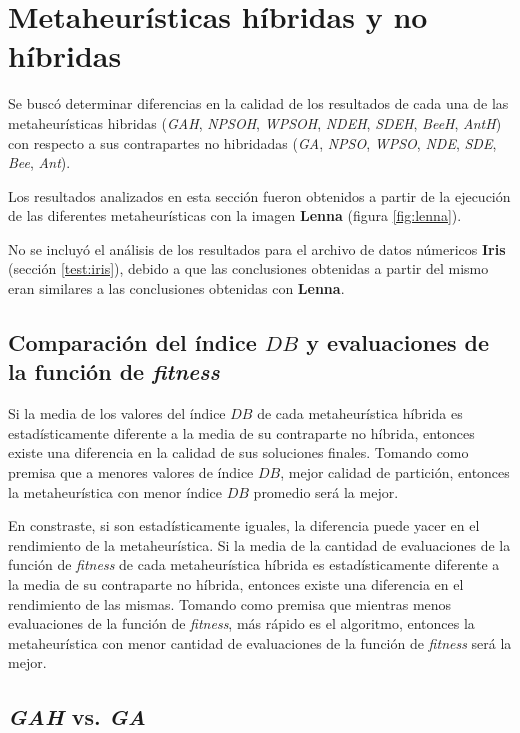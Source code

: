 \chapter{Metaheurísticas híbridas y no híbridas}
\label{apendicec}

	Se buscó determinar diferencias en la calidad de los resultados de cada
una de las metaheurísticas hibridas (\emph{GAH}, \emph{NPSOH}, \emph{WPSOH},
\emph{NDEH}, \emph{SDEH}, \emph{BeeH}, \emph{AntH}) con respecto a sus
contrapartes no hibridadas (\emph{GA}, \emph{NPSO}, \emph{WPSO},
\emph{NDE}, \emph{SDE}, \emph{Bee}, \emph{Ant}).

	Los resultados analizados en esta sección fueron obtenidos a partir de la
ejecución de las diferentes metaheurísticas con la imagen \textbf{Lenna}
(figura \ref{fig:lenna}).

	No se incluyó el análisis de los resultados para el archivo de datos númericos
\textbf{Iris} (sección \ref{test:iris}), debido a que las conclusiones obtenidas
a partir del mismo eran similares a las conclusiones obtenidas con \textbf{Lenna}.

\section{Comparación del índice $DB$ y evaluaciones de la función de \emph{fitness}}

	Si la media de los valores del índice $DB$ de cada metaheurística híbrida
es estadísticamente diferente a la media de su contraparte no híbrida, entonces
existe una diferencia en la calidad de sus soluciones finales. Tomando como
premisa que a menores valores de índice $DB$, mejor calidad de partición,
entonces la metaheurística con menor índice $DB$ promedio será la mejor.

	En constraste, si son estadísticamente iguales, la diferencia puede yacer en
el rendimiento de la metaheurística. Si la media de la cantidad de evaluaciones
de la función de \emph{fitness} de cada metaheurística híbrida es estadísticamente
diferente a la media de su contraparte no híbrida, entonces existe una diferencia
en el rendimiento de las mismas. Tomando como premisa que mientras menos
evaluaciones de la función de \emph{fitness}, más rápido es el algoritmo, entonces
la metaheurística con menor cantidad de evaluaciones de la función de \emph{fitness}
será la mejor.

\section{\emph{GAH} vs. \emph{GA}}


